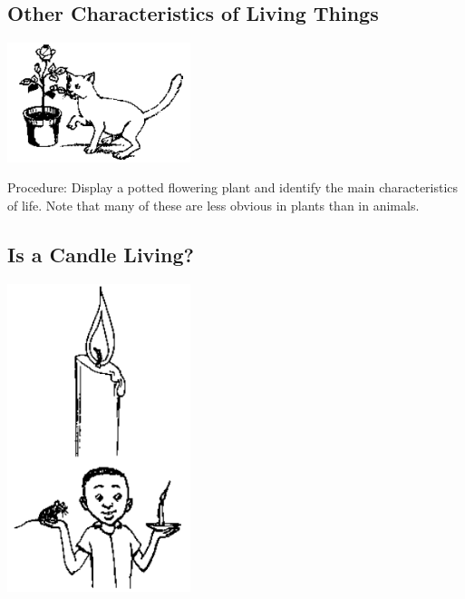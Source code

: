 \begin{multicols}{2}
\subsection{Other Characteristics of Living Things} %

\begin{center}
\includegraphics[width=0.4\textwidth]{./img/source/other-char-living.png}
\end{center}

\begin{description*}
\item[Procedure:]{Display a potted flowering plant and identify the main characteristics of life. Note that many
of these are less obvious in plants than in animals.}
\end{description*}

\subsection{Is a Candle Living?} %

\begin{center}
\includegraphics[width=0.4\textwidth]{./img/source/candle-living.png}
\end{center}


\end{multicols}
